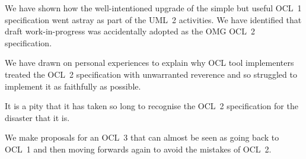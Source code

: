 \documentclass{jot}
\begin{document}
We have shown how the well-intentioned upgrade of the simple but useful OCL~1 specification went astray as part of the UML~2 activities. We have identified that draft work-in-progress was accidentally adopted as the OMG OCL~2 specification.

We have drawn on personal experiences to explain why OCL tool implementers treated the OCL~2 specification with unwarranted reverence and so struggled to implement it as faithfully as possible.

It is a pity that it has taken so long to recognise the OCL~2 specification for the disaster that it is.

We make proposals for an OCL~3 that can almost be seen as going back to OCL~1 and then moving forwards again to avoid the mistakes of OCL~2.

\backmatter




\abouttheauthors

\end{document}
